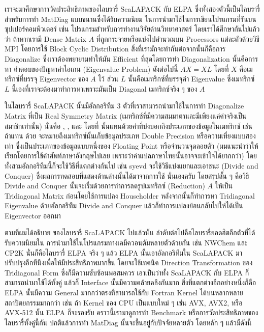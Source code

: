เราจะมาศึกษาการวัดประสิทธิภาพของไลบรารี่ ScaLAPACK กับ ELPA ซึ่งทั้งสองตัวนี้เป็นไลบรารี่สำหรับการทำ MatDiag แบบขนานซึ่งได้รับความนิยม%
ในการนำมาใช้ในการเขียนโปรแกรมที่รันบนซุปเปอร์คอมพิวเตอร์ เช่น โปรแกรมสำหรับการทำงานวิจัยด้านวิทยาศาสตร์ โดยเราได้ศึกษากันไปแล้วว่า%
ถ้าหากเรามี Dense Matrix $A$ ที่ถูกกระจายหรือแบ่งไปคำนวณบน Processors แต่ละตัวด้วยวิธี MPI โดยการใช้ Block Cyclic Distribution
สิ่งที่เรามักจะทำกันต่อจากนั้นก็คือการ Diagonalize ซึ่งเราต้องพยายามทำให้มัน Efficient ที่สุดโดยการทำ Diagonalization นั้นคือการหา%
คำตอบของปัญหาค่าไอเกน (Eigenvalue Problem) ดังต่อไปนี้ $AX = XL$ โดยที่ $X$ คือเมทริกซ์ที่บรรจุ Eigenvector ของ $A$ ไว้ ส่วน $L$
นั้นคือเมทริกซ์ที่บรรจุค่า Eigenvalue ซึ่งเมทริกซ์ $L$ นี้เองที่เราจะต้องมาทำการหาเพราะมันเป็น Diagonal เมทริกซ์จริง ๆ ของ $A$

ในไลบรารี่ ScaLAPACK นั้นมีอัลกอริทึม 3 ตัวที่เราสามารถนำมาใช้ในการทำ Diagonalize Matrix ที่เป็น Real Symmetry Matrix
(เมทริกซ์ที่มีความสมมาตรและมีเพียงแค่ค่าจริงเป็นสมาชิกเท่านั้น) นั่นคือ , ,
และ  โดยที่  นั้นแทนด้วยค่าที่บ่งบอกถึงประเภทของข้อมูลในเมทริกซ์ เช่น ถ้าแทน
 ด้วย  จะหมายถึงเมทริกซ์นั้นเก็บข้อมูลประเภท Double Precision หรือความเที่ยงแบบสองเท่า%
ซึ่งเป็นประเภทของข้อมูลแบบหนึ่งของ Floating Point หรือจำนวนจุดลอยตัว (ผมแนะนำว่าให้เรียกโดยการใช้คำศัพท์ภาษาอังกฤษไปเลย
เพราะว่าคำแปลภาษาไทยนั้นอาจจะเข้าใจได้ยากกว่า) โดยทั้งสามอัลกอริทึมนี้ก็จะใช้วิธีที่แตกต่างกันไป เช่น syevd จะใช้วิธีแบ่งแยกและเอาชนะ
(Divide and Conquer) ซึ่งผลการทดสอบที่แสดงด้านล่างนั้นได้มาจากการใช้  นั่นเองครับ โดยสรุปสั้น ๆ คือวิธี
Divide and Conquer นั้นจะเริ่มด้วยการทำการลดรูปเมทริกซ์ (Reduction) $A$ ให้เป็น Tridiagonal Matrix ก่อนโดยใช้การแปลง
Householder หลังจากนั้นก็ทำการหา Tridiagonal Eigenvalue ด้วยอัลกอริทึม Divide and Conquer แล้วก็ทำการแปลงย้อนกลับไปให้ได้เป็น
Eigenvector ออกมา

ตามที่ผมได้อธิบาย  ของไลบรารี่ ScaLAPACK ไปแล้วนั้น ลำดับต่อไปคือไลบรารี่ยอดฮิตอีกตัวที่ได้รับความนิยมใน%
การนำมาใช้ในโปรแกรมทางเคมีควอนตัมหลายตัวด้วยกัน เช่น NWChem และ CP2K นั่นก็คือไลบรารี่ ELPA จริง ๆ แล้ว ELPA นั้นเอาอัลกอริทึมใน
ScaLAPACK มาปรับปรุงอีกทีนึงเพื่อให้มีประสิทธิภาพมากขึ้น โดยจะใช้เทคนิค Direction Transformation ของ Tridiagonal Form
ซึ่งก็มีความซับซ้อนพอสมควร เอาเป็นว่าทั้ง ScaLAPACK กับ ELPA ก็สามารถนำมาใช้ได้ทั้งคู่ แล้วก็ Interface นั้นมีความคล้ายคลึงกันมาก
สิ่งที่แตกต่างอีกอย่างหนึ่งก็คือ ELPA นั้นมีความ General มากกว่าตรงที่สามารถใช้กับ Fortran Kernel ได้บนหลากหลายสถาปัตยกรรมมากกว่า
เช่น ถ้า Kernel ของ CPU เป็นแบบใหม่ ๆ เช่น AVX, AVX2, หรือ AVX-512 นั้น ELPA ก็จะรองรับ คราวนี้เรามาดูการทำ Benchmark
หรือการวัดประสิทธิภาพของไลบรารี่ทั้งคู่นี้กัน ปกติแล้วการทำ MatDiag นั้นจะขึ้นอยู่กับปัจจัยหลายตัว โดยหลัก ๆ แล้วมีดังนี้

